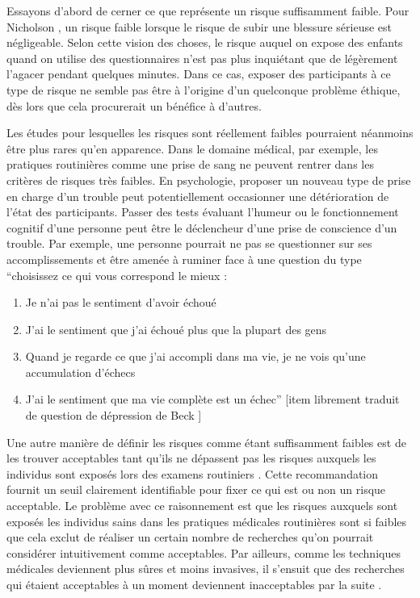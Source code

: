 \documentclass[
  12pt,
]{book}
\providecommand{\tightlist}{%
  \setlength{\itemsep}{0pt}\setlength{\parskip}{0pt}}
\begin{document}
Essayons d'abord de cerner ce que représente un risque suffisamment faible. Pour Nicholson \citeyearpar{Nicholson1986-NICMRW}, un risque faible lorsque le risque de subir une blessure sérieuse est négligeable. Selon cette vision des choses, le risque auquel on expose des enfants quand on utilise des questionnaires n'est pas plus inquiétant que de légèrement l'agacer pendant quelques minutes. Dans ce cas, exposer des participants à ce type de risque ne semble pas être à l'origine d'un quelconque problème éthique, dès lors que cela procurerait un bénéfice à d'autres.

Les études pour lesquelles les risques sont réellement faibles pourraient néanmoins être plus rares qu'en apparence. Dans le domaine médical, par exemple, les pratiques routinières comme une prise de sang ne peuvent rentrer dans les critères de risques très faibles. En psychologie, proposer un nouveau type de prise en charge d'un trouble peut potentiellement occasionner une détérioration de l'état des participants. Passer des tests évaluant l'humeur ou le fonctionnement cognitif d'une personne peut être le déclencheur d'une prise de conscience d'un trouble. Par exemple, une personne pourrait ne pas se questionner sur ses accomplissements et être amenée à ruminer face à une question du type ``choisissez ce qui vous correspond le mieux :

\begin{enumerate}
\def\labelenumi{\arabic{enumi})}
\tightlist
\item
  Je n'ai pas le sentiment d'avoir échoué
\item
  J'ai le sentiment que j'ai échoué plus que la plupart des gens
\item
  Quand je regarde ce que j'ai accompli dans ma vie, je ne vois qu'une accumulation d'échecs
\item
  J'ai le sentiment que ma vie complète est un échec''
  {[}item librement traduit de question de dépression de Beck \citeyearpar{Beck2011-ph}{]}
\end{enumerate}

Une autre manière de définir les risques comme étant suffisamment faibles est de les trouver acceptables tant qu'ils ne dépassent pas les risques auxquels les individus sont exposés lors des examens routiniers \citep[\citet{Resnik2005}]{Kopelman2000}. Cette recommandation fournit un seuil clairement identifiable pour fixer ce qui est ou non un risque acceptable. Le problème avec ce raisonnement est que les risques auxquels sont exposés les individus sains dans les pratiques médicales routinières sont si faibles que cela exclut de réaliser un certain nombre de recherches qu'on pourrait considérer intuitivement comme acceptables. Par ailleurs, comme les techniques médicales deviennent plus sûres et moins invasives, il s'ensuit que des recherches qui étaient acceptables à un moment deviennent inacceptables par la suite \citep{sep-clinical-research}.
\end{document}
